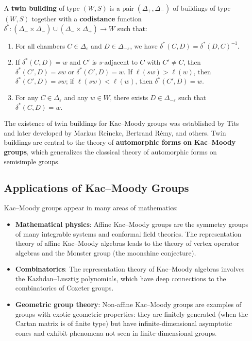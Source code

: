 \begin{definition}
A \textbf{twin building} of type \((W, S)\) is a pair \((\Delta_+, \Delta_-)\) of buildings of type \((W, S)\) together with a \textbf{codistance} function \(\delta^*: (\Delta_+ \times \Delta_-) \cup (\Delta_- \times \Delta_+) \to W\) such that:
\begin{enumerate}
    \item For all chambers \(C \in \Delta_\varepsilon\) and \(D \in \Delta_{-\varepsilon}\), we have \(\delta^*(C, D) = \delta^*(D, C)^{-1}\).
    \item If \(\delta^*(C, D) = w\) and \(C'\) is \(s\)-adjacent to \(C\) with \(C' \neq C\), then \(\delta^*(C', D) = s w\) or \(\delta^*(C', D) = w\). If \(\ell(s w) > \ell(w)\), then \(\delta^*(C', D) = s w\); if \(\ell(s w) < \ell(w)\), then \(\delta^*(C', D) = w\).
    \item For any \(C \in \Delta_\varepsilon\) and any \(w \in W\), there exists \(D \in \Delta_{-\varepsilon}\) such that \(\delta^*(C, D) = w\).
\end{enumerate}
\end{definition}

The existence of twin buildings for Kac--Moody groups was established by Tits and later developed by Markus Reineke, Bertrand R\'emy, and others. Twin buildings are central to the theory of \textbf{automorphic forms on Kac--Moody groups}, which generalizes the classical theory of automorphic forms on semisimple groups.

\subsection{Applications of Kac--Moody Groups}

Kac--Moody groups appear in many areas of mathematics:
\begin{itemize}
    \item \textbf{Mathematical physics}: Affine Kac--Moody groups are the symmetry groups of many integrable systems and conformal field theories. The representation theory of affine Kac--Moody algebras leads to the theory of vertex operator algebras and the Monster group (the moonshine conjecture).
    \item \textbf{Combinatorics}: The representation theory of Kac--Moody algebras involves the Kazhdan--Lusztig polynomials, which have deep connections to the combinatorics of Coxeter groups.
    \item \textbf{Geometric group theory}: Non-affine Kac--Moody groups are examples of groups with exotic geometric properties: they are finitely generated (when the Cartan matrix is of finite type) but have infinite-dimensional asymptotic cones and exhibit phenomena not seen in finite-dimensional groups.
\end{itemize}

